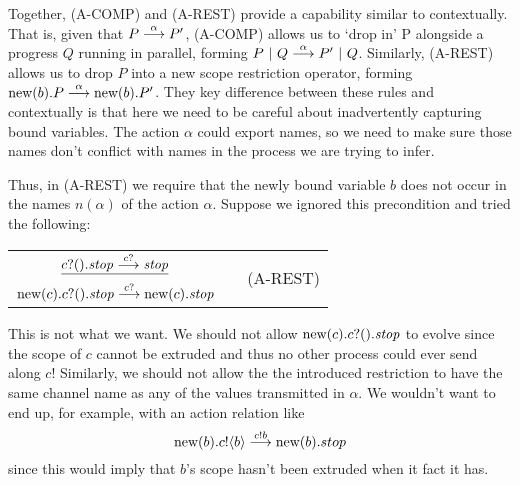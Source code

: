 Together, (A-COMP) and (A-REST) provide a capability similar to contextually.  
That is, given that $P \overset{{\alpha}}{\longrightarrow} P'$, (A-COMP) allows us to `drop in' P alongside a progress $Q$ running in parallel, forming $P\ |\  Q \overset{{\alpha}}{\longrightarrow} P' \ |\  Q$.
Similarly, (A-REST) allows us to drop $P$ into a new scope restriction operator, forming $\text{new}({b}).P \overset{{\alpha}}{\longrightarrow} \text{new}({b}).P'$.
They key difference between these rules and contextually is that here we need to be careful about inadvertently capturing bound variables.
The action $\alpha$ could export names, so we need to make sure those names don't conflict with names in the process we are trying to infer.

Thus, in (A-REST) we require that the newly bound variable $b$ does not occur in the names $n(\alpha)$ of the action $\alpha$.  
Suppose we ignored this precondition and tried the following:
\begin{center}\begin{tabular}{rllll}
	\multicolumn{3}{c}{$\underline{{c}?({}).\mbox{\emph{stop}} \overset{{{c}?{}}}{\longrightarrow} \mbox{\emph{stop}}}$} & & \multirow{2}{*}{\tiny{(A-REST)}}\\
	\multicolumn{3}{c}{$\text{new}({c}). {c}?({}).\mbox{\emph{stop}} \overset{{{c}?{}}}{\longrightarrow} \text{new}({c}). \mbox{\emph{stop}}$}\\[10pt]
\end{tabular}\end{center}
This is not what we want.  
We should not allow $\text{new}({c}). {c}?({}).\mbox{\emph{stop}}$ to evolve since the scope of $c$ cannot be extruded and thus no other process could ever send along $c$!  
Similarly, we should not allow the the introduced restriction to have the same channel name as any of the values transmitted in $\alpha$.  
We wouldn't want to end up, for example, with an action relation like 
\[
	\text{new}({b}). {c}!\langle{b}\rangle \overset{{{c}!{b}}}{\longrightarrow} \text{new}({b}). stop
\]
since this would imply that $b$'s scope hasn't been extruded when it fact it has.


